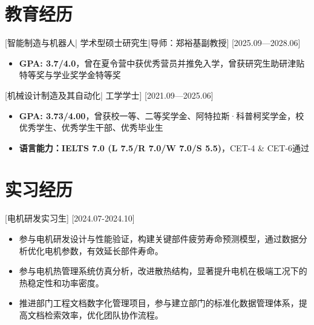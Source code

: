 \documentclass{resume}
\begin{document}


\ResumeTitle


\section{教育经历}

[\textnormal{智能制造与机器人|} 学术型硕士研究生\textnormal{|}导师：郑裕基副教授]
[2025.09—2028.06]
\begin{itemize}
  \item \textbf{GPA: 3.7/4.0}，曾在夏令营中获优秀营员并推免入学，曾获研究生助研津贴特等奖与学业奖学金特等奖
\end{itemize}

[\textnormal{机械设计制造及其自动化|} 工学学士]
[2021.09—2025.06]
\begin{itemize}
  \item \textbf{GPA: 3.73/4.00}，曾获校一等、二等奖学金、阿特拉斯·科普柯奖学金，校优秀学生、优秀学生干部、优秀毕业生
  \item \textbf{语言能力：IELTS 7.0 (L 7.5/R 7.0/W 7.0/S 5.5)}，CET-4 \& CET-6通过
\end{itemize}


\section{实习经历}

[电机研发实习生]
[2024.07-2024.10] 

\begin{itemize}
  \item 参与电机研发设计与性能验证，构建关键部件疲劳寿命预测模型，通过数据分析优化电机参数，有效延长部件寿命。
  \item 参与电机热管理系统仿真分析，改进散热结构，显著提升电机在极端工况下的热稳定性和功率密度。
  \item 推进部门工程文档数字化管理项目，参与建立部门的标准化数据管理体系，提高文档检索效率，优化团队协作流程。
\end{itemize}
\end{document}
